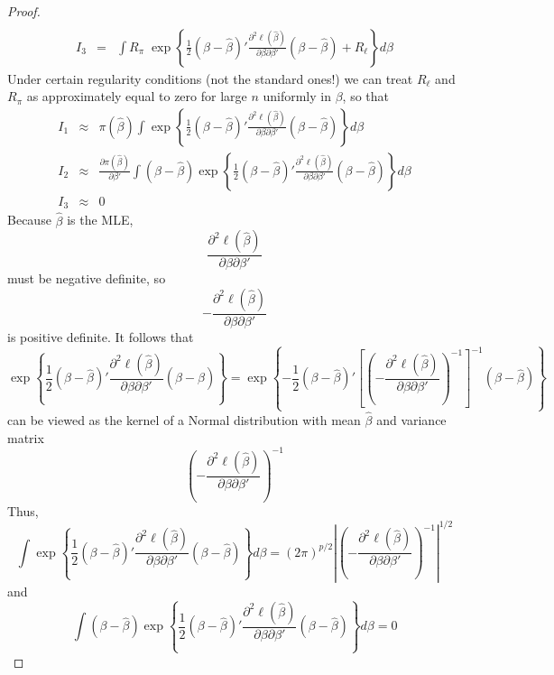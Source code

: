 \begin{proof}
\begin{eqnarray*}
\\
		I_3 &=& \int R_\pi \; \exp{\left\{ \frac{1}{2} \left( \beta - \hat{\beta}  \right)' \frac{\partial^2 \ell(\hat{\beta})}{\partial \beta \partial \beta'} \left( \beta - \hat{\beta}  \right) + R_\ell\right\}} d\beta
	\end{eqnarray*}
Under certain regularity conditions (not the standard ones!) we can treat $R_\ell$ and $R_\pi$ as approximately equal to zero for large $n$ uniformly in $\beta$, so that
	\begin{eqnarray*}
		I_1 &\approx& \pi(\hat{\beta}) \int  \exp{\left\{ \frac{1}{2} \left( \beta - \hat{\beta}  \right)' \frac{\partial^2 \ell(\hat{\beta})}{\partial \beta \partial \beta'} \left( \beta - \hat{\beta}  \right) \right\}} d\beta\\
		I_2 &\approx& \frac{\partial \pi(\hat{\beta})}{\partial \beta'}   \int  \left(\beta - \hat{\beta}  \right) \exp{\left\{ \frac{1}{2} \left( \beta - \hat{\beta}  \right)' \frac{\partial^2 \ell(\hat{\beta})}{\partial \beta \partial \beta'} \left( \beta - \hat{\beta}  \right) \right\}} d\beta\\
		I_3 &\approx& 0
	\end{eqnarray*}	
Because $\hat{\beta}$ is the MLE, 
	$$\frac{\partial^2 \ell(\hat{\beta})}{\partial \beta \partial \beta'}$$ 
must be negative definite, so 
	$$-\frac{\partial^2 \ell(\hat{\beta})}{\partial \beta \partial \beta'}$$
is positive definite. It follows that 
	$$ \exp{\left\{ \frac{1}{2} \left( \beta - \hat{\beta}  \right)' \frac{\partial^2 \ell(\hat{\beta})}{\partial \beta \partial \beta'} \left( \beta - \hat{\beta}  \right) \right\}} =  \exp{\left\{ -\frac{1}{2} \left( \beta - \hat{\beta}  \right)'\left[ \left(-\frac{\partial^2 \ell(\hat{\beta})}{\partial \beta \partial \beta'}\right)^{-1} \right]^{-1}\left( \beta - \hat{\beta}  \right) \right\}}$$
can be viewed as the kernel of a Normal distribution with mean $\hat{\beta}$ and variance matrix 
	$$\left(-\frac{\partial^2 \ell(\hat{\beta})}{\partial \beta \partial \beta'}\right)^{-1}$$
Thus,
	$$\int  \exp{\left\{ \frac{1}{2} \left( \beta - \hat{\beta}  \right)' \frac{\partial^2 \ell(\hat{\beta})}{\partial \beta \partial \beta'} \left( \beta - \hat{\beta}  \right) \right\}} d\beta = \left(2\pi\right)^{p/2}\left| \left(-\frac{\partial^2 \ell(\hat{\beta})}{\partial \beta \partial \beta'}\right)^{-1} \right|^{1/2}$$
and
	$$\int \left(\beta - \hat{\beta}  \right)  \exp{\left\{ \frac{1}{2} \left( \beta - \hat{\beta}  \right)' \frac{\partial^2 \ell(\hat{\beta})}{\partial \beta \partial \beta'} \left( \beta - \hat{\beta}  \right) \right\}} d\beta = 0$$

\end{proof}
